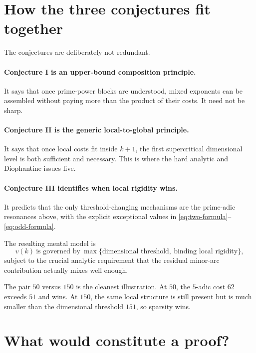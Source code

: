 \documentclass[../Axiomathic.tex]{subfiles}
\begin{document}
\section{How the three conjectures fit together}

The conjectures are deliberately not redundant.

\paragraph{Conjecture I is an upper-bound composition principle.}
It says that once prime-power blocks are understood, mixed exponents can be assembled without paying more than the product of their costs.  It need not be sharp.

\paragraph{Conjecture II is the generic local-to-global principle.}
It says that once local costs fit inside $k+1$, the first supercritical dimensional level is both sufficient and necessary.  This is where the hard analytic and Diophantine issues live.

\paragraph{Conjecture III identifies when local rigidity wins.}
It predicts that the only threshold-changing mechanisms are the prime-adic resonances above, with the explicit exceptional values in \eqref{eq:two-formula}--\eqref{eq:odd-formula}.

The resulting mental model is
\begin{equation}\label{eq:mental-model}
  \boxed{
  v(k)\ \text{is governed by}\
  \max\{\text{dimensional threshold},\ \text{binding local rigidity}\},
  }
\end{equation}
subject to the crucial analytic requirement that the residual minor-arc contribution actually mixes well enough.

The pair $50$ versus $150$ is the cleanest illustration.  At $50$, the $5$-adic cost $62$ exceeds $51$ and wins.  At $150$, the same local structure is still present but is much smaller than the dimensional threshold $151$, so sparsity wins.

\section{What would constitute a proof?}
\end{document}
